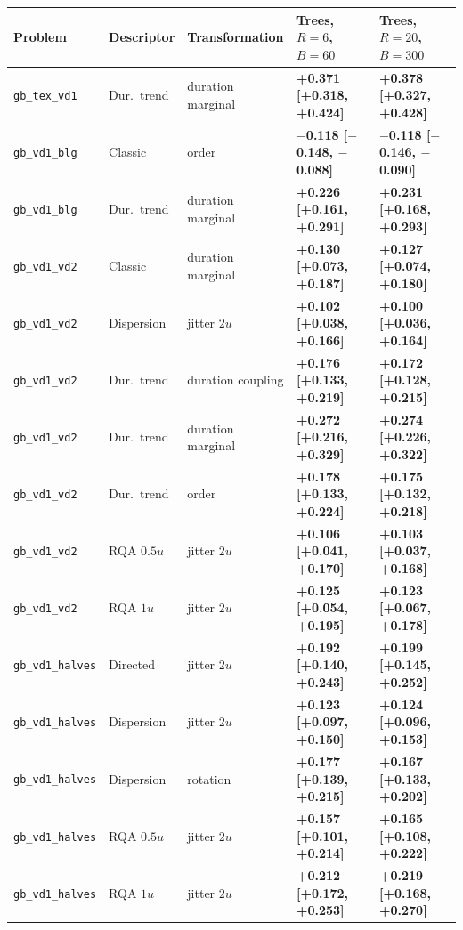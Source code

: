 \begin{tabular}{lllll}
\toprule
Problem & Descriptor & Transformation & Trees, $R = 6$, $B = 60$ & Trees, $R = 20$, $B = 300$ \\
\midrule
\texttt{gb\_tex\_vd1} & Dur.\ trend & duration marginal & \textbf{+0.371 [+0.318, +0.424]} & \textbf{+0.378 [+0.327, +0.428]} \\
\texttt{gb\_vd1\_blg} & Classic & order & \textbf{$-$0.118 [$-$0.148, $-$0.088]} & \textbf{$-$0.118 [$-$0.146, $-$0.090]} \\
\texttt{gb\_vd1\_blg} & Dur.\ trend & duration marginal & \textbf{+0.226 [+0.161, +0.291]} & \textbf{+0.231 [+0.168, +0.293]} \\
\texttt{gb\_vd1\_vd2} & Classic & duration marginal & \textbf{+0.130 [+0.073, +0.187]} & \textbf{+0.127 [+0.074, +0.180]} \\
\texttt{gb\_vd1\_vd2} & Dispersion & jitter $2u$ & \textbf{+0.102 [+0.038, +0.166]} & \textbf{+0.100 [+0.036, +0.164]} \\
\texttt{gb\_vd1\_vd2} & Dur.\ trend & duration coupling & \textbf{+0.176 [+0.133, +0.219]} & \textbf{+0.172 [+0.128, +0.215]} \\
\texttt{gb\_vd1\_vd2} & Dur.\ trend & duration marginal & \textbf{+0.272 [+0.216, +0.329]} & \textbf{+0.274 [+0.226, +0.322]} \\
\texttt{gb\_vd1\_vd2} & Dur.\ trend & order & \textbf{+0.178 [+0.133, +0.224]} & \textbf{+0.175 [+0.132, +0.218]} \\
\texttt{gb\_vd1\_vd2} & RQA $0.5u$ & jitter $2u$ & \textbf{+0.106 [+0.041, +0.170]} & \textbf{+0.103 [+0.037, +0.168]} \\
\texttt{gb\_vd1\_vd2} & RQA $1u$ & jitter $2u$ & \textbf{+0.125 [+0.054, +0.195]} & \textbf{+0.123 [+0.067, +0.178]} \\
\texttt{gb\_vd1\_halves} & Directed & jitter $2u$ & \textbf{+0.192 [+0.140, +0.243]} & \textbf{+0.199 [+0.145, +0.252]} \\
\texttt{gb\_vd1\_halves} & Dispersion & jitter $2u$ & \textbf{+0.123 [+0.097, +0.150]} & \textbf{+0.124 [+0.096, +0.153]} \\
\texttt{gb\_vd1\_halves} & Dispersion & rotation & \textbf{+0.177 [+0.139, +0.215]} & \textbf{+0.167 [+0.133, +0.202]} \\
\texttt{gb\_vd1\_halves} & RQA $0.5u$ & jitter $2u$ & \textbf{+0.157 [+0.101, +0.214]} & \textbf{+0.165 [+0.108, +0.222]} \\
\texttt{gb\_vd1\_halves} & RQA $1u$ & jitter $2u$ & \textbf{+0.212 [+0.172, +0.253]} & \textbf{+0.219 [+0.168, +0.270]} \\

\end{tabular}
